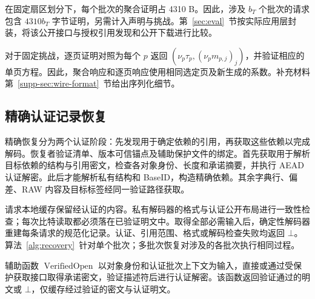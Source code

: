 \documentclass[10pt,journal]{IEEEtran}
\begin{document}
在固定扇区划分下，每个批次的聚合证明占 4310 B。因此，涉及 $b_T$ 个批次的请求包含 $4310b_T$ 字节证明，另需计入声明与挑战。第~\ref{sec:eval}~节按实际应用层封装，将该公开接口与授权引用发现和公开下载进行比较。

对于固定挑战，逐页证明对照为每个 $p$ 返回 $(\nu_p\tau_p,(\nu_pm_{p,j})_j)$，并验证相应的单页方程。因此，聚合响应和逐页响应使用相同选定页及新生成的系数。补充材料第~\ref*{supp-sec:wire-format}~节给出序列化细节。

\subsection{精确认证记录恢复}\label{sec:c3}
精确恢复分为两个认证阶段：先发现用于确定依赖的引用，再获取这些依赖以完成解码。恢复者验证清单、版本可信锚点及辅助保护文件的绑定。首先获取用于解析目标依赖的结构与引用密文，检查各对象身份、长度和承诺摘要，并执行 AEAD 认证解密。此后才能解析私有结构和 BaseID，构造精确依赖。其余字典行、偏差、RAW 内容及目标标签经同一验证路径获取。

请求本地缓存保留经认证的内容。私有解码器的格式与认证公开布局进行一致性检查；每次比特读取都必须落在已验证明文中。取得全部必需输入后，确定性解码器重建每条请求的规范化记录。认证、引用范围、格式或解码检查失败均返回 $\bot$。算法~\ref{alg:recovery}~针对单个批次；多批次恢复对涉及的各批次执行相同过程。

辅助函数 $\operatorname{VerifiedOpen}$ 以对象身份和认证批次上下文为输入，直接或通过受保护获取接口取得承诺密文，验证描述符后进行认证解密。该函数返回验证通过的明文或 $\bot$，仅缓存经过验证的密文与认证明文。
\end{document}
